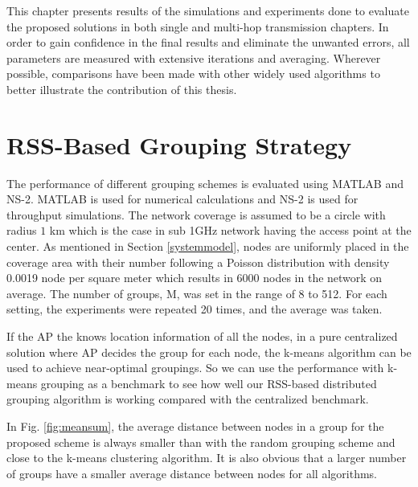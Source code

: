 \label{chapter:eval}
This chapter presents results of the simulations and experiments done to evaluate the proposed solutions in both single and multi-hop transmission chapters. In order to gain confidence in the final results and eliminate the unwanted errors, all parameters are measured with extensive iterations and averaging. Wherever possible, comparisons have been made with other widely used algorithms to better illustrate the contribution of this thesis. 

\section{RSS-Based Grouping Strategy}


The performance of different grouping schemes is evaluated using MATLAB and NS-2\cite{breslau2000advances}. MATLAB is used for numerical calculations and NS-2 is used for throughput simulations. The network coverage is assumed to be a circle with radius $1$ km which is the case in sub 1GHz network having the access point at the center. As mentioned in Section \ref{systemmodel}, nodes are uniformly placed in the coverage area with their number following a Poisson distribution with density 0.0019 node per square meter which results in 6000 nodes in the network on average. The number of groups, M, was set in the range of 8 to 512. For each setting, the experiments were repeated 20 times, and the average was taken. 



If the AP the knows location information of all the nodes, in a pure centralized solution where AP decides the group for each node, the k-means algorithm can be used to achieve near-optimal groupings. So we can use the performance with k-means grouping as a benchmark to see how well our RSS-based distributed grouping algorithm is working compared with the centralized benchmark.

In Fig. \ref{fig:meansum}, the average distance between nodes in a group for the proposed scheme is always smaller than with the random grouping scheme and close to the k-means clustering algorithm. It is also obvious that a larger number of groups have a smaller average distance between nodes for all algorithms. 

